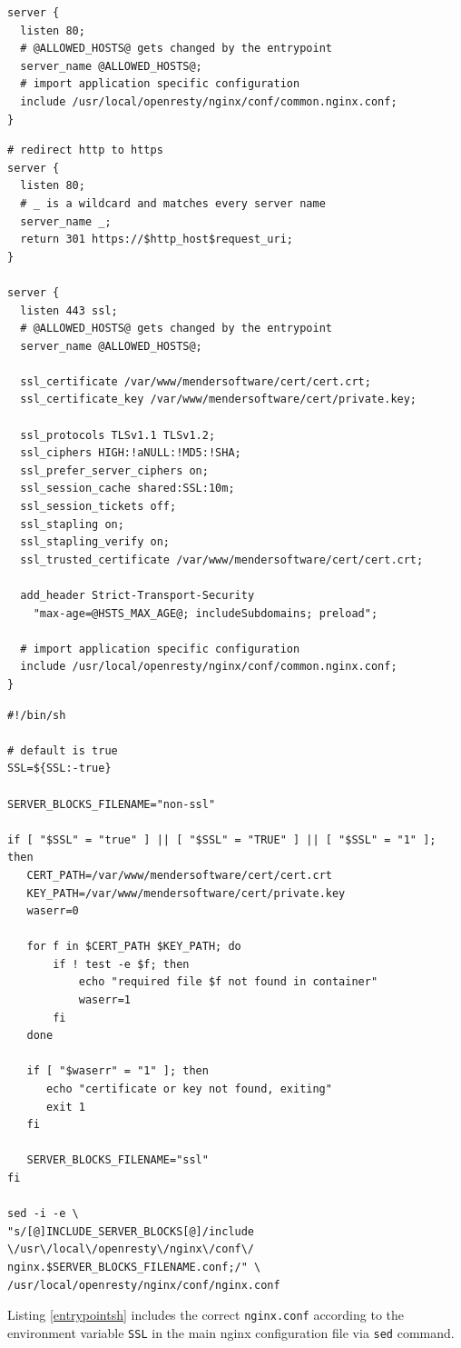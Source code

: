 \begin{code}
  \begin{verbatim}
server {
  listen 80;
  # @ALLOWED_HOSTS@ gets changed by the entrypoint
  server_name @ALLOWED_HOSTS@;
  # import application specific configuration
  include /usr/local/openresty/nginx/conf/common.nginx.conf;
}
  \end{verbatim}
\end{code}
\begin{code}
  \begin{verbatim}
# redirect http to https
server {
  listen 80;
  # _ is a wildcard and matches every server name
  server_name _;
  return 301 https://$http_host$request_uri;
}

server {
  listen 443 ssl;
  # @ALLOWED_HOSTS@ gets changed by the entrypoint
  server_name @ALLOWED_HOSTS@;

  ssl_certificate /var/www/mendersoftware/cert/cert.crt;
  ssl_certificate_key /var/www/mendersoftware/cert/private.key;

  ssl_protocols TLSv1.1 TLSv1.2;
  ssl_ciphers HIGH:!aNULL:!MD5:!SHA;
  ssl_prefer_server_ciphers on;
  ssl_session_cache shared:SSL:10m;
  ssl_session_tickets off;
  ssl_stapling on;
  ssl_stapling_verify on;
  ssl_trusted_certificate /var/www/mendersoftware/cert/cert.crt;

  add_header Strict-Transport-Security
    "max-age=@HSTS_MAX_AGE@; includeSubdomains; preload";

  # import application specific configuration
  include /usr/local/openresty/nginx/conf/common.nginx.conf;
}
  \end{verbatim}
\end{code}
\begin{code}
  \label{entrypointsh}
  \begin{verbatim}
#!/bin/sh

# default is true
SSL=${SSL:-true}

SERVER_BLOCKS_FILENAME="non-ssl"

if [ "$SSL" = "true" ] || [ "$SSL" = "TRUE" ] || [ "$SSL" = "1" ]; then
   CERT_PATH=/var/www/mendersoftware/cert/cert.crt
   KEY_PATH=/var/www/mendersoftware/cert/private.key
   waserr=0

   for f in $CERT_PATH $KEY_PATH; do
       if ! test -e $f; then
           echo "required file $f not found in container"
           waserr=1
       fi
   done

   if [ "$waserr" = "1" ]; then
      echo "certificate or key not found, exiting"
      exit 1
   fi

   SERVER_BLOCKS_FILENAME="ssl"
fi

sed -i -e \
"s/[@]INCLUDE_SERVER_BLOCKS[@]/include 
\/usr\/local\/openresty\/nginx\/conf\/
nginx.$SERVER_BLOCKS_FILENAME.conf;/" \
/usr/local/openresty/nginx/conf/nginx.conf
  \end{verbatim}
\end{code}
Listing \ref{entrypointsh} includes the correct \verb|nginx.conf| according to the environment variable \verb|SSL| in the main nginx configuration file via \verb|sed| command.

